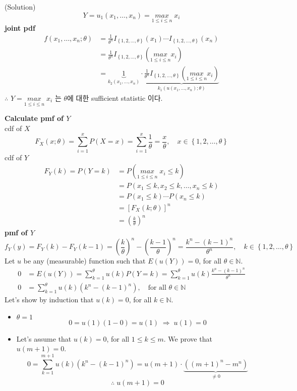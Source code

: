 \documentclass{oblivoir}
\newcommand{\flr}[1]{\left ( #1 \right )}
\newcommand{\slr}[1]{\left \{ #1 \right \}}
\newcommand{\tlr}[1]{\left [ #1 \right]}
\newcommand{\blue}[1]{{\color{blue} #1}}
\begin{document}
\begin{enumerate}
\begin{enumerate}
\blue{(Solution)}
$$
Y = u_1(x_1,\ldots, x_n) = \underset{1\leq i \leq n}{max} \; x_i
$$
\textbf{joint pdf}
\begin{align*}
f(x_1,\ldots, x_n ; \theta) &= \frac{1}{\theta^n} I_{\slr{1,2,\ldots,\theta}}(x_1) \cdots I_{\slr{1,2,\ldots,\theta}}(x_n) \\
&= \frac{1}{\theta^n} I_{\slr{1,2,\ldots,\theta}}(\underset{1\leq i \leq n}{max} x_i) \\
&=  \underset{k_2(x_1,\ldots,x_n)}{\underbrace{1}} \cdot \underset{k_1(u(x_1, \ldots, x_n);\theta)}{\underbrace{\frac{1}{\theta^n} I_{\slr{1,2,\ldots,\theta}}(\underset{1\leq i \leq n}{max} x_i)}}
\end{align*}
$\therefore$ $Y = \underset{1\leq i \leq n}{max} \; x_i$ 는 $\theta$에 대한 sufficient statistic 이다.

\textbf{Calculate pmf of $Y$} \\
cdf of $X$
$$
F_X(x;\theta) = \sum_{i=1}^x P(X=x) = \sum_{i=1}^x \frac{1}{\theta} = \frac{x}{\theta} , \quad x \in \slr{1,2,\ldots, \theta}
$$
cdf of $Y$
\begin{align*}
F_Y(k) = P(Y=k) &= P(\underset{1\leq i \leq n}{max} \; x_i \leq k) \\
&= P(x_1 \leq k, x_2 \leq k, \ldots, x_n \leq k) \\
&= P(x_1 \leq k) \cdots P(x_n \leq k) \\
&= \tlr{F_X(k;\theta)}^n\\
&= \flr{\frac{k}{\theta}}^n
\end{align*}
\textbf{pmf of $Y$}
$$
f_Y(y) = F_Y(k) - F_Y(k-1) = \flr{\frac{k}{\theta}}^n - \flr{\frac{k-1}{\theta}}^n = \frac{k^n - (k-1)^n}{\theta^n}, \quad k \in \slr{1,2,\ldots, \theta}
$$
Let $u$ be any (measurable) function such that $E(u(Y)) = 0$, for all $\theta \in \mathbb{N}$.
\begin{align*}
0 &= E(u(Y)) = \sum_{k=1}^{\theta} u(k) P(Y=k) = \sum_{k=1}^{\theta} u(k) \frac{k^n - (k-1)^n}{\theta^n} \\
0 &= \sum_{k=1}^{\theta} u(k) (k^n - (k-1)^n) , \quad \mbox{for all } \theta \in \mathbb{N}
\end{align*}
Let's show by induction that $u(k) = 0$, for all $k \in \mathbb{N}$.
\begin{itemize}
\item 
$\theta = 1$
$$
0 = u(1)(1-0) = u(1) \; \Rightarrow \; u(1) = 0
$$

\item
Let's assume that $u(k) = 0$, for all $1 \leq k \leq m$. We prove that $u(m+1) = 0$.
$$
0 = \sum_{k=1}^{m+1} u(k) (k^n - (k-1)^n) = u(m+1) \cdot \underset{\ne 0}{\underbrace{((m+1)^n - m^n)}}
$$
$$
\therefore \; u(m+1) = 0
$$


\end{itemize}
\end{enumerate}
\end{enumerate}
\end{document}
